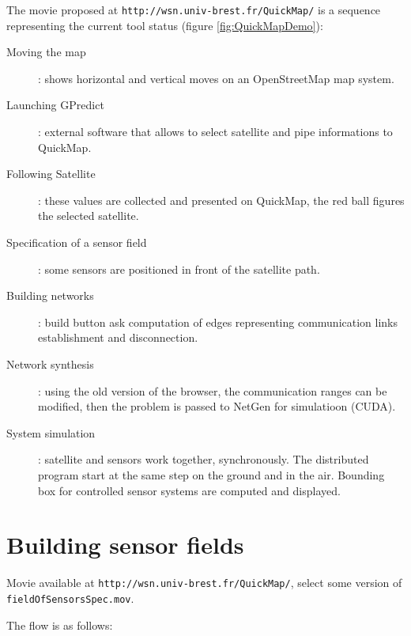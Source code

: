 The movie proposed at  {\tt http://wsn.univ-brest.fr/QuickMap/} is a sequence representing 
the current tool status (figure \ref{fig:QuickMapDemo}):

\begin{description}
\item  [Moving the map ]: shows horizontal and vertical moves on an OpenStreetMap map system. 
\item [Launching GPredict  ]: external software that allows to select satellite and pipe informations to QuickMap. 
\item [Following Satellite ]: these values are collected and presented on QuickMap, the red ball figures the selected satellite. 
\item [Specification of a sensor field]: some sensors are positioned in front of the satellite path.
\item [Building networks ]: build button ask computation of edges representing communication links establishment and disconnection.
\item [Network synthesis ]: using the old version of the browser, the communication ranges can be modified, then the problem is passed to NetGen for simulatioon (CUDA).
\item [System simulation ]:  satellite and sensors work together, synchronously. The distributed program start at the same step
on the ground and in the air. Bounding box for controlled sensor systems are computed and displayed.
\end{description}

\section{Building sensor fields}

Movie available at  {\tt http://wsn.univ-brest.fr/QuickMap/}, select some version of {\tt fieldOfSensorsSpec.mov}.

The flow is as follows:


